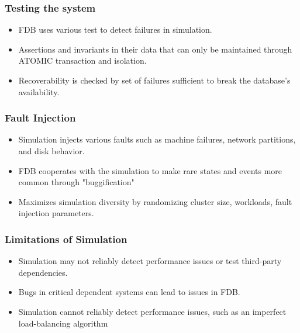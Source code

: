 \begin{frame}
    \frametitle{Testing the system}
    \begin{itemize}
        \item FDB uses various test to detect failures in simulation.
        \item Assertions and invariants
in their data that can only be maintained through ATOMIC transaction and isolation.
        \item Recoverability is checked by set of failures sufficient to break
the database’s availability.
    \end{itemize}
\end{frame}
\begin{frame}
    \frametitle{Fault Injection}
    \begin{itemize}
        \item Simulation injects various faults such as machine failures, network partitions, and disk behavior.
        \item FDB cooperates with the simulation to make rare states and events more common through "buggification"
        \item Maximizes simulation diversity by randomizing cluster size, workloads, fault injection parameters.
    \end{itemize}
\end{frame}
\begin{frame}
    \frametitle{Limitations of Simulation}
    \begin{itemize}
        \item Simulation may not reliably detect performance issues or test third-party dependencies.
        \item Bugs in critical dependent systems can lead to issues in FDB.
        \item Simulation cannot reliably detect performance issues, such as an imperfect load-balancing algorithm
    \end{itemize}
\end{frame}